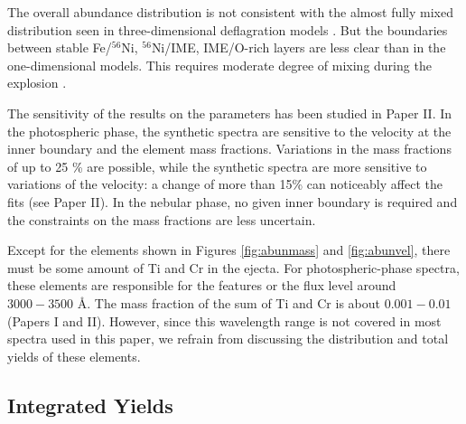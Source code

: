 \documentclass[usegraphicx,usenatbib]{mn2e}
\newcommand{\Nifs}{$^{56}$Ni}
\begin{document}
The overall abundance distribution is not consistent with the almost fully mixed
distribution seen in three-dimensional deflagration models
\citep{travaglio04,roepke05}. But the boundaries between stable Fe/\Nifs,
\Nifs/IME, IME/O-rich layers are less clear than in the one-dimensional models.
This requires moderate degree of mixing during the explosion \citep{woosley07}.

The sensitivity of the results on the parameters has been studied in Paper II.
In the photospheric phase, the synthetic spectra are sensitive to the velocity
at the inner boundary and the element mass fractions. Variations in the mass
fractions of up to 25 \% are possible, while the synthetic spectra are more
sensitive to variations of the velocity: a change of more than 15\% can
noticeably affect the fits (see Paper II). In the nebular phase, no given inner
boundary is required and the constraints on the mass fractions are less
uncertain.


Except for the elements shown in Figures \ref{fig:abunmass} and \ref{fig:abunvel},
there must be some amount of Ti and Cr in the ejecta.
For photospheric-phase spectra, these elements are responsible 
for the features or the flux level around $3000-3500$ \AA.
The mass fraction of the sum of Ti and Cr is about $0.001-0.01$ (Papers I and II).
However, since this wavelength range is not covered in most spectra 
used in this paper,
we refrain from discussing the distribution and total yields of these elements.



\subsection{Integrated Yields}
\label{sec:yield}
\end{document}

